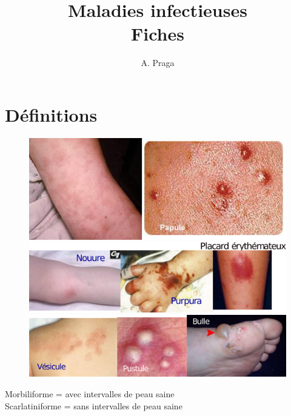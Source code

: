 \documentclass{article}
\title{Maladies infectieuses\\
\large Fiches}
\author{A. Praga}
\begin{document}
\maketitle

\tableofcontents
\newpage

\section{Définitions}%
\label{sec:definitions}

\begin{figure}
  \centering
  \includegraphics[width=0.8\linewidth]{160_macule_papule}
  \includegraphics[width=0.8\linewidth]{160_purpura_placard}
  \includegraphics[width=0.8\linewidth]{160_vesicule}
\end{figure}

Morbiliforme = avec intervalles de peau saine\\
Scarlatiniforme = sans intervalles de peau saine


%
%
%
%
%
%
%
%
%
%
%
%
%
%
%
%
%
%
%
%
%
%
%
%
%
%
\end{document}
